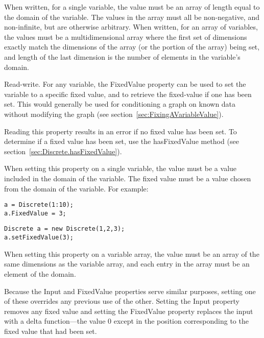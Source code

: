 When written, for a single variable, the value must be an array of length equal to the domain of the variable.  The values in the array must all be non-negative, and non-infinite, but are otherwise arbitrary.  When written, for an array of variables, the values must be a multidimensional array where the first set of dimensions exactly match the dimensions of the array (or the portion of the array) being set, and length of the last dimension is the number of elements in the variable's domain.


\label{sec:Discrete.FixedValue}

Read-write.  For any variable, the FixedValue property can be used to set the variable to a specific fixed value, and to retrieve the fixed-value if one has been set.  This would generally be used for conditioning a graph on known data without modifying the graph (see section~\ref{sec:FixingAVariableValue}).

Reading this property results in an error if no fixed value has been set.  To determine if a fixed value has been set, use the hasFixedValue method (see section~\ref{sec:Discrete.hasFixedValue}).

When setting this property on a single variable, the value must be a value included in the domain of the variable.
The fixed value must be a value chosen from the domain of the variable.  For example:

\ifmatlab
\begin{lstlisting}
a = Discrete(1:10);
a.FixedValue = 3;
\end{lstlisting}
\fi

\ifjava
\begin{lstlisting}
Discrete a = new Discrete(1,2,3);
a.setFixedValue(3);
\end{lstlisting}
\fi

When setting this property on a variable array, the value must be an array of the same dimensions as the variable array, and each entry in the array must be an element of the domain.

Because the Input and FixedValue properties serve similar purposes, setting one of these overrides any previous use of the other.  Setting the Input property removes any fixed value and setting the FixedValue property replaces the input with a delta function---the value 0 except in the position corresponding to the fixed value that had been set.



\label{sec:Discrete.hasFixedValue}

